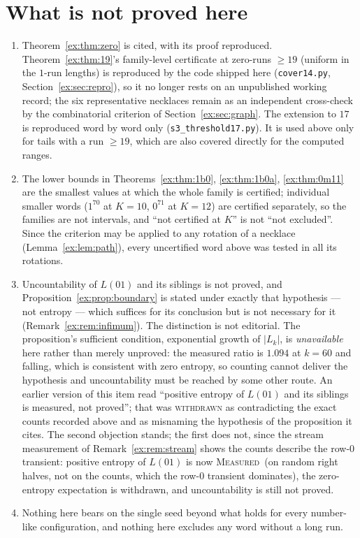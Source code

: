 \documentclass[11pt]{article}
\theoremstyle{definition}
\theoremstyle{remark}
\newcommand{\MEASURED}{\textsc{Measured}}
\begin{document}
\section{What is not proved here}
\begin{enumerate}[nosep]
\item Theorem~\ref{ex:thm:zero} is cited, with its proof reproduced. Theorem~\ref{ex:thm:19}'s family-level certificate at zero-runs $\ge19$ (uniform in the $1$-run lengths) is reproduced by the code shipped here (\texttt{cover14.py}, Section~\ref{ex:sec:repro}), so it no longer rests on an unpublished working record; the six representative necklaces remain as an independent cross-check by the combinatorial criterion of Section~\ref{ex:sec:graph}. The extension to $17$ is reproduced word by word only (\texttt{s3\_threshold17.py}). It is used above only for tails with a run $\ge19$, which are also covered directly for the computed ranges.
\item The lower bounds in Theorems~\ref{ex:thm:1b0}, \ref{ex:thm:1b0a}, \ref{ex:thm:0m11} are the smallest values at which the whole family is certified; individual smaller words ($1^70$ at $K=10$, $0^71$ at $K=12$) are certified separately, so the families are not intervals, and ``not certified at $K$'' is not ``not excluded''. Since the criterion may be applied to any rotation of a necklace (Lemma~\ref{ex:lem:path}), every uncertified word above was tested in all its rotations.
\item Uncountability of $L(01)$ and its siblings is not proved, and Proposition~\ref{ex:prop:boundary} is stated under exactly that hypothesis --- not entropy --- which suffices for its conclusion but is not necessary for it (Remark~\ref{ex:rem:infimum}). The distinction is not editorial. The proposition's sufficient condition, exponential growth of $|L_k|$, is \emph{unavailable} here rather than merely unproved: the measured ratio is $1.094$ at $k=60$ and falling, which is consistent with zero entropy, so counting cannot deliver the hypothesis and uncountability must be reached by some other route. An earlier version of this item read ``positive entropy of $L(01)$ and its siblings is measured, not proved''; that was \textsc{withdrawn} as contradicting the exact counts recorded above and as misnaming the hypothesis of the proposition it cites. The second objection stands; the first does not, since the stream measurement of Remark~\ref{ex:rem:stream} shows the counts describe the row-$0$ transient: positive entropy of $L(01)$ is now \MEASURED\ (on random right halves, not on the counts, which the row-$0$ transient dominates), the zero-entropy expectation is withdrawn, and uncountability is still not proved.
\item Nothing here bears on the single seed beyond what holds for every number-like configuration, and nothing here excludes any word without a long run.
\end{enumerate}
\end{document}
